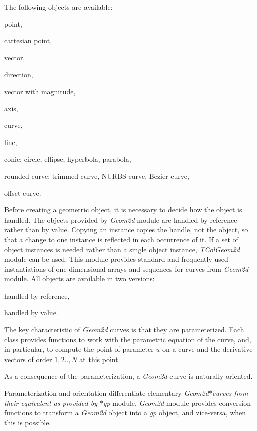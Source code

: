 The following objects are available\+:
\begin{DoxyItemize}
\item point,
\item cartesian point,
\item vector,
\item direction,
\item vector with magnitude,
\item axis,
\item curve,
\item line,
\item conic\+: circle, ellipse, hyperbola, parabola,
\item rounded curve\+: trimmed curve, N\+U\+R\+BS curve, Bezier curve,
\item offset curve.
\end{DoxyItemize}

Before creating a geometric object, it is necessary to decide how the object is handled. The objects provided by {\itshape Geom2d} module are handled by reference rather than by value. Copying an instance copies the handle, not the object, so that a change to one instance is reflected in each occurrence of it. If a set of object instances is needed rather than a single object instance, {\itshape T\+Col\+Geom2d} module can be used. This module provides standard and frequently used instantiations of one-\/dimensional arrays and sequences for curves from {\itshape Geom2d} module. All objects are available in two versions\+:
\begin{DoxyItemize}
\item handled by reference,
\item handled by value.
\end{DoxyItemize}

The key characteristic of {\itshape Geom2d} curves is that they are parameterized. Each class provides functions to work with the parametric equation of the curve, and, in particular, to compute the point of parameter $u$ on a curve and the derivative vectors of order $1, 2.., N$ at this point.

As a consequence of the parameterization, a {\itshape Geom2d} curve is naturally oriented.

Parameterization and orientation differentiate elementary {\itshape Geom2d$\ast$curves from their equivalent as provided by $\ast$gp} module. {\itshape Geom2d} module provides conversion functions to transform a {\itshape Geom2d} object into a {\itshape gp} object, and vice-\/versa, when this is possible.

